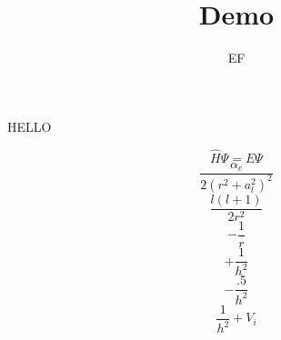 \documentclass[10pt,a4paper]{article}
\title{Demo}
\author{EF}
\begin{document}
	\maketitle
	HELLO
	
	\[\hat{H}\Psi = E\Psi\]
	\[\frac{\alpha_c}{2(r^2 + a_l^2)^2} \]
	\[\frac{l(l+1)}{2r^2} \]
	\[-\frac{1}{r}\]
	\[+\frac{1}{h^2}\]
	\[-\frac{.5}{h^2}\]
	\[\frac{1}{h^2} + V_{i}\]
\end{document}
